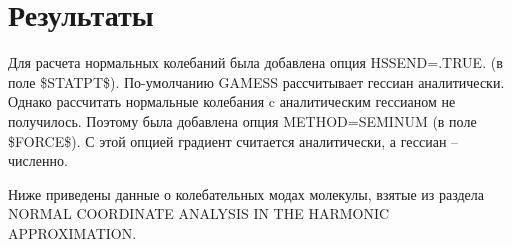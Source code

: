 \section{Результаты}
Для расчета нормальных колебаний была добавлена опция HSSEND=.TRUE. (в поле \$STATPT\$). По-умолчанию GAMESS рассчитывает гессиан аналитически. Однако рассчитать нормальные колебания c аналитическим гессианом не получилось. Поэтому была добавлена опция METHOD=SEMINUM (в поле \$FORCE\$). С этой опцией градиент считается аналитически, а гессиан -- численно.

Ниже приведены данные о колебательных модах молекулы, взятые из раздела NORMAL COORDINATE ANALYSIS IN THE HARMONIC APPROXIMATION.
\begin{table}[]
    \caption{Нормальные колебания молекулы}
    \begin{center}
    \label{tab:my-table}
\end{center}
\end{table}
